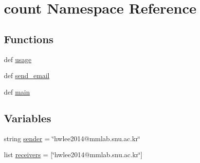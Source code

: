 \hypertarget{namespacecount}{\section{count Namespace Reference}
\label{namespacecount}
}
\subsection*{Functions}
\begin{DoxyCompactItemize}
\item 
def \hyperlink{namespacecount_a1c7e89e7f984dc2a024070abcc133752}{usage}
\item 
def \hyperlink{namespacecount_a7edc9bb9159a550985af38c7c9e3f1f0}{send\-\_\-email}
\item 
def \hyperlink{namespacecount_a8c8562bd1f673e5713399ee98758d8ff}{main}
\end{DoxyCompactItemize}
\subsection*{Variables}
\begin{DoxyCompactItemize}
\item 
string \hyperlink{namespacecount_aa29d28df5aa168596050b302fe58d4e1}{sender} = \char`\"{}hwlee2014@mmlab.\-snu.\-ac.\-kr\char`\"{}
\item 
list \hyperlink{namespacecount_aa95252e71ac90e82668dde262f69321d}{receivers} = \mbox{[}\char`\"{}hwlee2014@mmlab.\-snu.\-ac.\-kr\char`\"{}\mbox{]}
\end{DoxyCompactItemize}


